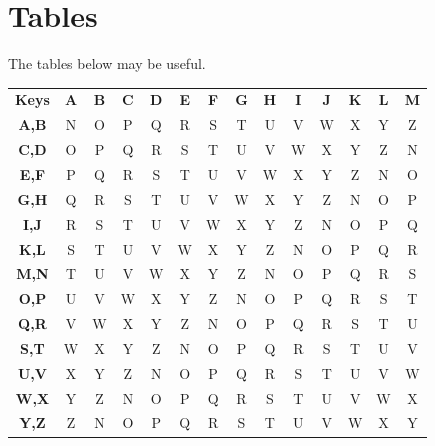 \documentclass{article}
\numberwithin{figure}{section}
\numberwithin{equation}{section}
\begin{document}
\sffamily
\newpage
\section*{Tables}  %
The tables below may be useful. \\

{

\begin{tabular}{|c|*{13}{c|}}
\rowcolor{gray!40}
\cellcolor{gray!40}\textbf{Keys}&\textbf{A}&\textbf{B}&\textbf{C}&\textbf{D}&\textbf{E}&\textbf{F}&\textbf{G}&\textbf{H}&\textbf{I}&\textbf{J}&\textbf{K}&\textbf{L}&\textbf{M}\\
\rowcolor{gray!15}
\cellcolor{gray!20}\textbf{A,B}&N&O&P&Q&R&S&T&U&V&W&X&Y&Z\\
\rowcolor{white}
\cellcolor{gray!20}\textbf{C,D}&O&P&Q&R&S&T&U&V&W&X&Y&Z&N\\
\rowcolor{gray!15}
\cellcolor{gray!20}\textbf{E,F}&P&Q&R&S&T&U&V&W&X&Y&Z&N&O\\
\rowcolor{white}
\cellcolor{gray!20}\textbf{G,H}&Q&R&S&T&U&V&W&X&Y&Z&N&O&P\\
\rowcolor{gray!15}
\cellcolor{gray!20}\textbf{I,J}&R&S&T&U&V&W&X&Y&Z&N&O&P&Q\\
\rowcolor{white}
\cellcolor{gray!20}\textbf{K,L}&S&T&U&V&W&X&Y&Z&N&O&P&Q&R\\
\rowcolor{gray!15}
\cellcolor{gray!20}\textbf{M,N}&T&U&V&W&X&Y&Z&N&O&P&Q&R&S\\
\rowcolor{white}
\cellcolor{gray!20}\textbf{O,P}&U&V&W&X&Y&Z&N&O&P&Q&R&S&T\\
\rowcolor{gray!15}
\cellcolor{gray!20}\textbf{Q,R}&V&W&X&Y&Z&N&O&P&Q&R&S&T&U\\
\rowcolor{white}
\cellcolor{gray!20}\textbf{S,T}&W&X&Y&Z&N&O&P&Q&R&S&T&U&V\\
\rowcolor{gray!15}
\cellcolor{gray!20}\textbf{U,V}&X&Y&Z&N&O&P&Q&R&S&T&U&V&W\\
\rowcolor{white}
\cellcolor{gray!20}\textbf{W,X}&Y&Z&N&O&P&Q&R&S&T&U&V&W&X\\
\rowcolor{gray!15}
\cellcolor{gray!20}\textbf{Y,Z}&Z&N&O&P&Q&R&S&T&U&V&W&X&Y\\
\end{tabular}

\vspace{-7.8cm}

}
\end{document}
